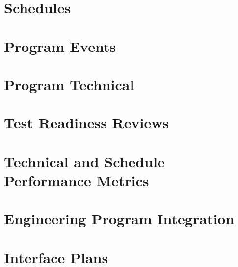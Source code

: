 \section{Schedules}

\section{Program Events}

\section{Program Technical}

\section{Test Readiness Reviews}

\section{Technical and Schedule Performance Metrics}

\section{Engineering Program Integration}

\section{Interface Plans}
